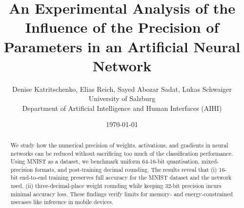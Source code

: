 \documentclass[11pt]{article}
\title{An Experimental Analysis of the Influence of the Precision of Parameters in an Artificial Neural Network}
\author{Denise Katritschenko, Elias Reich, Sayed Abozar Sadat, Lukas Schwaiger\\
	\small University of Salzburg\\
	\small Department of Artificial Intelligence and Human Interfaces (AIHI) }
\date{\today}
\begin{document}
\maketitle

\begin{abstract}
	We study how the numerical precision of weights, activations, and gradients in neural networks can be reduced without sacrificing too much of the classification performance. Using MNIST as a dataset, we benchmark uniform 64-16-bit quantisation, mixed-precision formats, and post-training decimal rounding. The results reveal that (i) 16-bit end-to-end training preserves full accuracy for the MNIST dataset and the network used, (ii) three-decimal-place weight rounding while keeping 32-bit precision incurs minimal accuracy loss. These findings verify limits for memory- and energy-constrained usecases like inference in mobile devices.
\end{abstract}
\end{document}
